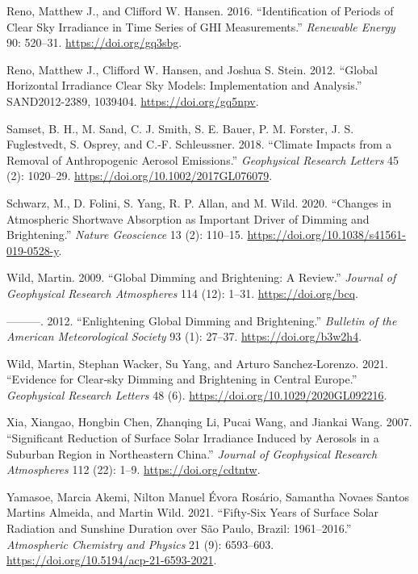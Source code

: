 \documentclass[
  preprint, 3p, authoryear]{article}
\newlength{\cslhangindent}
\newlength{\cslentryspacingunit} %
\newenvironment{CSLReferences}[2] %
 {%
  \setlength{\parindent}{0pt}
  \ifodd #1
  \let\oldpar\par
  \def\par{\hangindent=\cslhangindent\oldpar}
  \fi
  \setlength{\parskip}{#2\cslentryspacingunit}
 }%
 {}
\begin{document}
\begin{CSLReferences}{1}{0}
\leavevmode{}%
Reno, Matthew J., and Clifford W. Hansen. 2016. {``Identification of Periods of Clear Sky Irradiance in Time Series of GHI Measurements.''} \emph{Renewable Energy} 90: 520--31. \url{https://doi.org/gq3sbg}.

\leavevmode{}%
Reno, Matthew J., Clifford W. Hansen, and Joshua S. Stein. 2012. {``Global Horizontal Irradiance Clear Sky Models: Implementation and Analysis.''} SAND2012-2389, 1039404. \url{https://doi.org/gq5npv}.

\leavevmode{}%
Samset, B. H., M. Sand, C. J. Smith, S. E. Bauer, P. M. Forster, J. S. Fuglestvedt, S. Osprey, and C.‐F. Schleussner. 2018. {``Climate Impacts from a Removal of Anthropogenic Aerosol Emissions.''} \emph{Geophysical Research Letters} 45 (2): 1020--29. \url{https://doi.org/10.1002/2017GL076079}.

\leavevmode{}%
Schwarz, M., D. Folini, S. Yang, R. P. Allan, and M. Wild. 2020. {``Changes in Atmospheric Shortwave Absorption as Important Driver of Dimming and Brightening.''} \emph{Nature Geoscience} 13 (2): 110--15. \url{https://doi.org/10.1038/s41561-019-0528-y}.

\leavevmode{}%
Wild, Martin. 2009. {``Global Dimming and Brightening: A Review.''} \emph{Journal of Geophysical Research Atmospheres} 114 (12): 1--31. \url{https://doi.org/bcq}.

\leavevmode{}%
---------. 2012. {``Enlightening Global Dimming and Brightening.''} \emph{Bulletin of the American Meteorological Society} 93 (1): 27--37. \url{https://doi.org/b3w2h4}.

\leavevmode{}%
Wild, Martin, Stephan Wacker, Su Yang, and Arturo Sanchez‐Lorenzo. 2021. {``Evidence for Clear‐sky Dimming and Brightening in Central Europe.''} \emph{Geophysical Research Letters} 48 (6). \url{https://doi.org/10.1029/2020GL092216}.

\leavevmode{}%
Xia, Xiangao, Hongbin Chen, Zhanqing Li, Pucai Wang, and Jiankai Wang. 2007. {``Significant Reduction of Surface Solar Irradiance Induced by Aerosols in a Suburban Region in Northeastern China.''} \emph{Journal of Geophysical Research Atmospheres} 112 (22): 1--9. \url{https://doi.org/cdtntw}.

\leavevmode{}%
Yamasoe, Marcia Akemi, Nilton Manuel Évora Rosário, Samantha Novaes Santos Martins Almeida, and Martin Wild. 2021. {``Fifty-Six Years of Surface Solar Radiation and Sunshine Duration over São Paulo, Brazil: 1961--2016.''} \emph{Atmospheric Chemistry and Physics} 21 (9): 6593--603. \url{https://doi.org/10.5194/acp-21-6593-2021}.


\end{CSLReferences}
\end{document}
